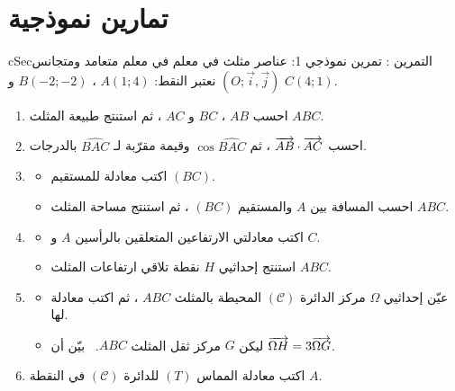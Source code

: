 \documentclass[12pt,a4paper]{article}
\newenvironment{BOX}[2]{\begin{otherlanguage}{english}\begin{arbox}{#1}{#2}}{\end{arbox}\end{otherlanguage}}
\newcounter{exo}
\newenvironment{tamrin}[1]{\stepcounter{exo}\begin{BOX}{cSec}{التمرين \theexo: #1}}{\end{BOX}}
\newenvironment{sq}{\begin{itemize}[leftmargin=2.4em,itemsep=3pt]}{\end{itemize}}
\newcommand{\qa}{\item[(أ)]}\newcommand{\qb}{\item[(ب)]}\newcommand{\qc}{\item[(جـ)]}\newcommand{\qd}{\item[(د)]}\newcommand{\qe}{\item[(هـ)]}
\begin{document}
\section{تمارين نموذجية}
\begin{tamrin}{تمرين نموذجي 1: عناصر مثلث في معلم}
في معلم متعامد ومتجانس $(O;\vec i,\vec j)$ نعتبر النقط: $A(1;4)$ ، $B(-2;-2)$ و $C(4;1)$.
\begin{enumerate}
\item احسب $AB$ ، $BC$ و $AC$ ، ثم استنتج طبيعة المثلث $ABC$.
\item احسب $\overrightarrow{AB}\cdot\overrightarrow{AC}$ ، ثم $\cos\widehat{BAC}$ وقيمة مقرّبة لـ $\widehat{BAC}$ بالدرجات.
\item
\begin{sq}
\qa اكتب معادلة للمستقيم $(BC)$.
\qb احسب المسافة بين $A$ والمستقيم $(BC)$ ، ثم استنتج مساحة المثلث $ABC$.
\end{sq}
\item
\begin{sq}
\qa اكتب معادلتي الارتفاعين المتعلقين بالرأسين $A$ و $C$.
\qb استنتج إحداثيي $H$ نقطة تلاقي ارتفاعات المثلث $ABC$.
\end{sq}
\item
\begin{sq}
\qa عيّن إحداثيي $\Omega$ مركز الدائرة $(\mathcal C)$ المحيطة بالمثلث $ABC$ ، ثم اكتب معادلة لها.
\qb ليكن $G$ مركز ثقل المثلث $ABC$. \ بيّن أن $\overrightarrow{\Omega H}=3\overrightarrow{\Omega G}$.
\end{sq}
\item اكتب معادلة المماس $(T)$ للدائرة $(\mathcal C)$ في النقطة $A$.
\end{enumerate}
\end{tamrin}
\end{document}
